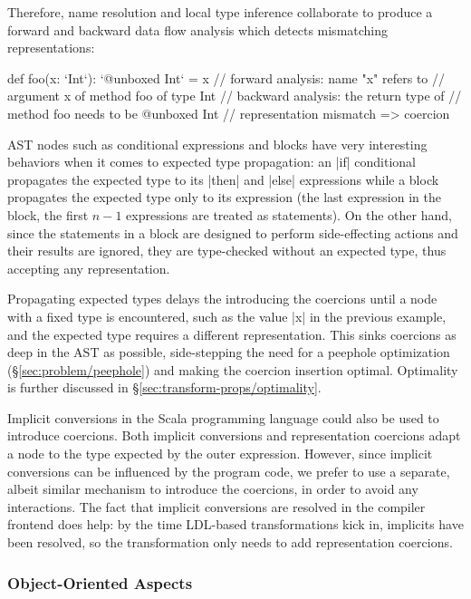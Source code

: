 Therefore, name resolution and local type inference collaborate to produce a forward and backward data flow analysis which detects mismatching representations:

\begin{lstlisting-nobreak}
 def foo(x: `Int`):  `@unboxed Int` =
   x // forward analysis: name "x" refers to
      //     argument x of method foo of type Int
      // backward analysis: the return type of
      //     method foo needs to be @unboxed Int
      // representation mismatch => coercion
\end{lstlisting-nobreak}

AST nodes such as conditional expressions and blocks have very interesting behaviors when it comes to expected type propagation: an |if| conditional propagates the expected type to its |then| and |else| expressions while a block propagates the expected type only to its expression (the last expression in the block, the first $n-1$ expressions are treated as statements). On the other hand, since the statements in a block are designed to perform side-effecting actions and their results are ignored, they are type-checked without an expected type, thus accepting any representation.

Propagating expected types delays the introducing the coercions until a node with a fixed type is encountered, such as the value |x| in the previous example, and the expected type requires a different representation. This sinks coercions as deep in the AST as possible, side-stepping the need for a peephole optimization (\S\ref{sec:problem/peephole}) and making the coercion insertion optimal. Optimality is further discussed in \S\ref{sec:transform-props/optimality}.

Implicit conversions in the Scala programming language could also be used to introduce coercions. Both implicit conversions and representation coercions adapt a node to the type expected by the outer expression. However, since implicit conversions can be influenced by the program code, we prefer to use a separate, albeit similar mechanism to introduce the coercions, in order to avoid any interactions. The fact that implicit conversions are resolved in the compiler frontend does help: by the time LDL-based transformations kick in, implicits have been resolved, so the transformation only needs to add representation coercions.

\subsubsection{Object-Oriented Aspects}
\label{subsec:coerce-object-oriented}

